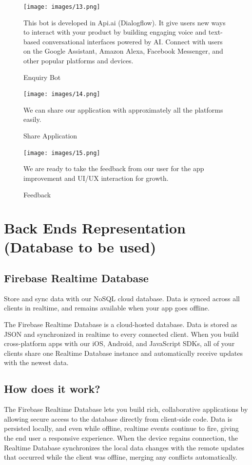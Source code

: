 \newpage

\begin{figure}[ht]
\centering
\texttt{[image: images/13.png]}
\caption{Enquiry Bot}
This bot is developed in Api.ai (Dialogflow). It give users new ways to interact with your product by building engaging voice and text-based conversational interfaces powered by AI. Connect with users on the Google Assistant, Amazon Alexa, Facebook Messenger, and other popular platforms and devices. 
\end{figure}

\newpage

\begin{figure}[ht]
\centering
\texttt{[image: images/14.png]}
\caption{Share Application}

We can share our application with approximately all the platforms easily.

\end{figure}

\newpage

\begin{figure}[ht]
\centering
\texttt{[image: images/15.png]}
\caption{Feedback}

We are ready to take the feedback from our user for the app improvement and UI/UX interaction for growth.
\end{figure}

\section{Back Ends Representation (Database to be used)}
\subsection{Firebase Realtime Database}
Store and sync data with our NoSQL cloud database. Data is synced across all clients in realtime, and remains available when your app goes offline.

The Firebase Realtime Database is a cloud-hosted database. Data is stored as JSON and synchronized in realtime to every connected client. When you build cross-platform apps with our iOS, Android, and JavaScript SDKs, all of your clients share one Realtime Database instance and automatically receive updates with the newest data.
\subsection{How does it work?}
The Firebase Realtime Database lets you build rich, collaborative applications by allowing secure access to the database directly from client-side code. Data is persisted locally, and even while offline, realtime events continue to fire, giving the end user a responsive experience. When the device regains connection, the Realtime Database synchronizes the local data changes with the remote updates that occurred while the client was offline, merging any conflicts automatically.

